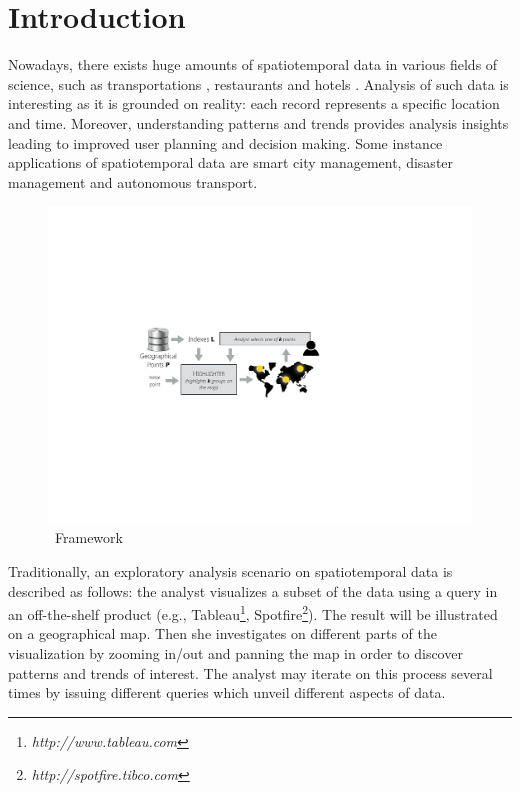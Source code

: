 \section{Introduction} 
Nowadays, there exists huge amounts of spatiotemporal data in various fields of science, such as transportations \cite{nyctaxi,nycbike}, restaurants \cite{yelp} and hotels \cite{airbnb}.
Analysis of such data is interesting as it is grounded
on reality: each record represents a specific location and time. Moreover, understanding patterns and trends provides analysis insights leading to improved user planning and decision making. Some instance applications of spatiotemporal data are smart city management, disaster management and autonomous transport.

\begin{figure}[t]
  \centering
  \includegraphics[width=\columnwidth]{figs/framework}
\caption{\framework\ Framework}
\label{fig:framework}
\vspace{-10pt}
\end{figure}

Traditionally, an exploratory analysis scenario on spatiotemporal data is described as follows: the analyst visualizes a subset of the data using a query in an off-the-shelf product (e.g., Tableau\footnote{\it http://www.tableau.com},
Spotfire\footnote{\it http://spotfire.tibco.com}). The result will be illustrated on a geographical map. Then she investigates on different parts of the visualization by zooming in/out and panning the map in order to discover patterns and trends of interest. The analyst may iterate on this process several times by issuing different queries which unveil different aspects of data. 

